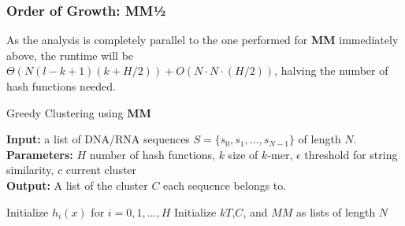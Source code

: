 \documentclass[../../main.tex]{subfiles}
\begin{document}
\subsubsection{Order of Growth: MM½}
As the analysis is completely parallel to the one performed for {\bf MM} immediately above, the runtime will be $\Theta(N (l-k+1)(k + H/2)) + O(N\cdot N\cdot (H/2))$, halving the number of hash functions needed.
\begin{algorithm}
\caption{Greedy Clustering using {\bf MM}}\label{alg:minmaxclust}
\textbf{Input:} a list of DNA/RNA sequences $S=\{s_0,s_1,...,s_{N-1}\}$ of length $N$.\\
\textbf{Parameters:} $H$ number of hash functions, $k$ size of $k$-mer,	$\epsilon$ threshold for string similarity, $c$ current cluster \\
\textbf{Output:} A list of the cluster $C$ each sequence belongs to.
\begin{algorithmic}[1]
\State Initialize $h_i(x)$ for $i=0,1,...,H$
\State Initialize $kT$,$C$, and $MM$ as lists of length $N$
\EndFor
{}
					\Else
						\EndIf
					\EndIf
				\EndFor
				\EndIf
			\EndIf
		\EndFor
	\EndIf
\EndFor
\end{algorithmic}
\end{algorithm}
\end{document}
